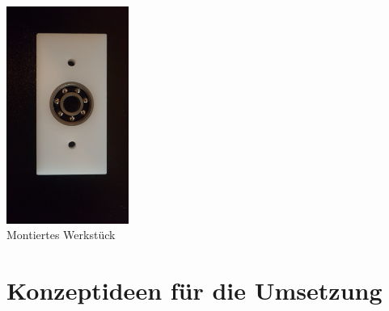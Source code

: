 \documentclass[12pt]{article}
\begin{document}
\begin{center}
\includegraphics[width=0.3\textwidth]{img/montiertes_werkstueck}\\
Montiertes Werkstück
\end{center}

\newpage
\section{Konzeptideen für die Umsetzung}
\end{document}
